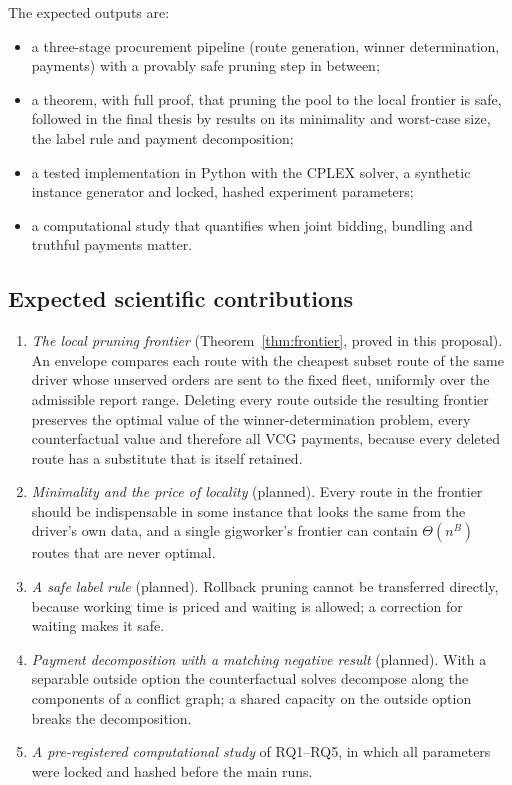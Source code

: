 The expected outputs are:
\begin{itemize}[leftmargin=*,itemsep=2pt]
\item a three-stage procurement pipeline (route generation, winner
determination, payments) with a provably safe pruning step in between;
\item a theorem, with full proof, that pruning the pool to the local frontier
is safe, followed in the final thesis by results on its minimality and
worst-case size, the label rule and payment decomposition;
\item a tested implementation in Python with the CPLEX solver, a synthetic
instance generator and locked, hashed experiment parameters;
\item a computational study that quantifies when joint bidding, bundling and
truthful payments matter.
\end{itemize}

\subsection{Expected scientific contributions}

\begin{enumerate}[leftmargin=*,itemsep=3pt]
\item \emph{The local pruning frontier} (Theorem~\ref{thm:frontier}, proved
in this proposal). An envelope compares each route with the cheapest subset
route of the same driver whose unserved orders are sent to the fixed fleet,
uniformly over the admissible report range. Deleting every route outside the
resulting frontier preserves the optimal value of the winner-determination
problem, every counterfactual value and therefore all VCG payments, because
every deleted route has a substitute that is itself retained.
\item \emph{Minimality and the price of locality} (planned). Every route in
the frontier should be indispensable in some instance that looks the same
from the driver's own data, and a single gigworker's frontier can contain
$\Theta(n^B)$ routes that are never optimal.
\item \emph{A safe label rule} (planned). Rollback pruning
\citep{lozano2016exact} cannot be transferred directly, because working time
is priced and waiting is allowed; a correction for waiting makes it safe.
\item \emph{Payment decomposition with a matching negative result}
(planned). With a separable outside option the counterfactual solves
decompose along the components of a conflict graph; a shared capacity on the
outside option breaks the decomposition.
\item \emph{A pre-registered computational study} of RQ1--RQ5, in which all
parameters were locked and hashed before the main runs.
\end{enumerate}

